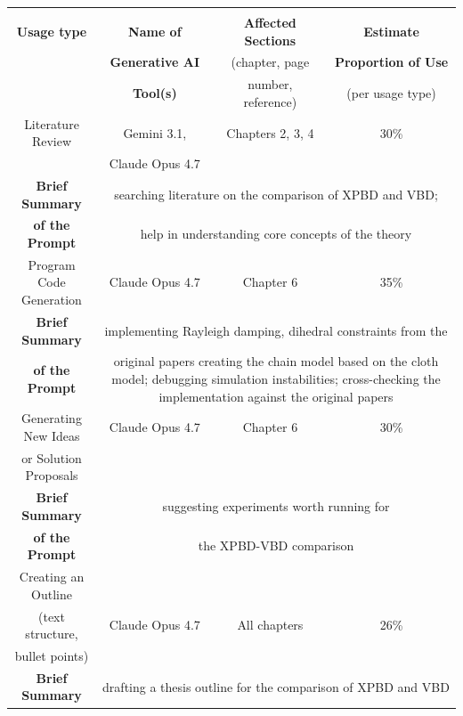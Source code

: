 \footnotesize{\noindent
	\renewcommand{\arraystretch}{0.95}%
	\begin{tabular}{|c|c|c|c|}\hline
		\hspace{38mm} & \hspace{28mm} & \hspace{28mm} & \hspace{28mm} \\
		\textbf{Usage type}	& \textbf{Name of} 	& \textbf{Affected Sections} 	& \textbf{Estimate} \\
		& \textbf{Generative AI} & (chapter, page & \textbf{Proportion of Use} \\
		& \textbf{Tool(s)} & number, reference) & (per usage type) \\ \hline \hline
		Literature Review & Gemini 3.1, & Chapters 2, 3, 4 & 30\% \\
		                  & Claude Opus 4.7 & & \\ \hline
		\textbf{Brief Summary}  &\multicolumn{3}{|p{96mm}|}{searching literature on the comparison of XPBD and VBD;} \\
		\textbf{of the Prompt}  &\multicolumn{3}{|p{96mm}|}{help in understanding core concepts of the theory} \\ \hline \hline
		Program Code Generation & Claude Opus 4.7 & Chapter 6 & 35\% \\ \hline
		\textbf{Brief Summary}  &\multicolumn{3}{|p{96mm}|}{implementing Rayleigh damping, dihedral constraints from the} \\
		\textbf{of the Prompt}  &\multicolumn{3}{|p{96mm}|}{original papers creating the chain model based on the cloth model; debugging simulation instabilities; cross-checking the implementation against the original papers} \\ \hline \hline
		Generating New Ideas & Claude Opus 4.7 & Chapter 6 & 30\% \\
		or Solution Proposals & & & \\ \hline
		\textbf{Brief Summary}  &\multicolumn{3}{|p{96mm}|}{suggesting experiments worth running for} \\
		\textbf{of the Prompt}  &\multicolumn{3}{|p{96mm}|}{the XPBD-VBD comparison} \\ \hline \hline
		Creating an Outline & & & \\
		(text structure, & Claude Opus 4.7 & All chapters & 26\% \\
		bullet points) & & & \\ \hline
		\textbf{Brief Summary}  &\multicolumn{3}{|p{96mm}|}{drafting a thesis outline for the comparison of XPBD and VBD} \\

\end{tabular}}
